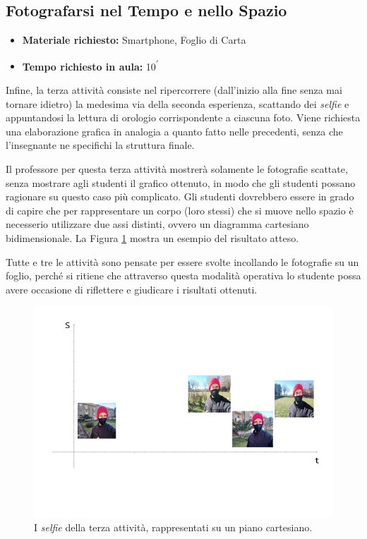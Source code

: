 \documentclass{report} \usepackage[T1]{fontenc} \usepackage[italian]{babel}
\begin{document}
\subsection{Fotografarsi nel Tempo e nello Spazio}

\begin{itemize}
\item \textbf{Materiale richiesto:} Smartphone, Foglio di Carta
\item \textbf{Tempo richiesto in aula:} 10\textsuperscript{$\prime$}
\end{itemize}

Infine, la terza attività consiste nel ripercorrere (dall'inizio alla fine
senza mai tornare idietro) la medesima via della
seconda esperienza, scattando dei \emph{selfie} e appuntandosi la lettura di orologio
corrispondente a ciascuna foto. Viene richiesta una elaborazione grafica in
analogia a quanto fatto nelle precedenti, senza che l’insegnante ne specifichi
la struttura finale.

Il professore per questa terza attività mostrerà solamente le fotografie
scattate, senza mostrare agli studenti il grafico ottenuto, in modo che gli
studenti possano ragionare su questo caso più complicato.
Gli studenti dovrebbero essere in grado di capire che per rappresentare
un corpo (loro stessi) che si muove nello spazio è necesserio utilizzare
due assi distinti, ovvero un diagramma cartesiano bidimensionale.
La Figura \ref{fig:piano_s_t} mostra un esempio del risultato atteso.

Tutte e tre le attività sono pensate per essere svolte incollando le fotografie
su un foglio, perché si ritiene che attraverso questa modalità operativa lo
studente  possa avere occasione di riflettere e giudicare i risultati ottenuti.
\begin{figure}[ht]
\centering
  \includegraphics[width=\textwidth]{piano_s_t}
  \caption{I \emph{selfie} della terza attività, rappresentati
           su un piano cartesiano.}
  \label{fig:piano_s_t}
\end{figure}
\end{document}

